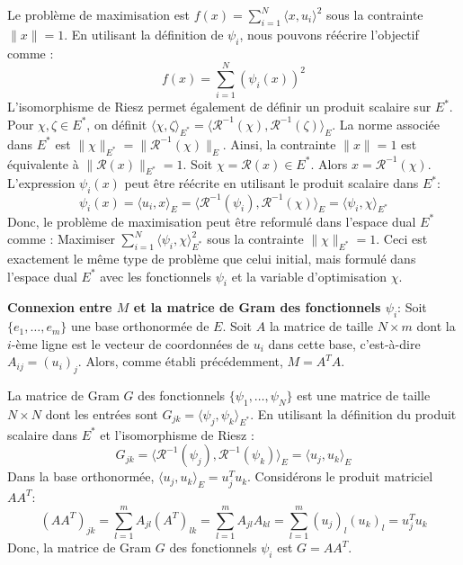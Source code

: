 \documentclass[11pt,a4paper]{report}
\begin{document}
Le problème de maximisation est
\(f(x) = \sum_{i=1}^N \langle x, u_i \rangle^2\) sous la contrainte
\(\|x\|=1\). En utilisant la définition de \(\psi_i\), nous pouvons
réécrire l'objectif comme : \[ f(x) = \sum_{i=1}^N (\psi_i(x))^2 \]
L'isomorphisme de Riesz permet également de définir un produit scalaire
sur \(E^*\). Pour \(\chi, \zeta \in E^*\), on définit
\(\langle \chi, \zeta \rangle_{E^*} = \langle \mathcal{R}^{-1}(\chi), \mathcal{R}^{-1}(\zeta) \rangle_E\).
La norme associée dans \(E^*\) est
\(\|\chi\|_{E^*} = \|\mathcal{R}^{-1}(\chi)\|_E\). Ainsi, la contrainte
\(\|x\|=1\) est équivalente à \(\|\mathcal{R}(x)\|_{E^*} = 1\). Soit
\(\chi = \mathcal{R}(x) \in E^*\). Alors \(x = \mathcal{R}^{-1}(\chi)\).
L'expression \(\psi_i(x)\) peut être réécrite en utilisant le produit
scalaire dans \(E^*\):
\[ \psi_i(x) = \langle u_i, x \rangle_E = \langle \mathcal{R}^{-1}(\psi_i), \mathcal{R}^{-1}(\chi) \rangle_E = \langle \psi_i, \chi \rangle_{E^*} \]
Donc, le problème de maximisation peut être reformulé dans l'espace dual
\(E^*\) comme : Maximiser
\(\sum_{i=1}^N \langle \psi_i, \chi \rangle_{E^*}^2\) sous la contrainte
\(\|\chi\|_{E^*} = 1\). Ceci est exactement le même type de problème que
celui initial, mais formulé dans l'espace dual \(E^*\) avec les
fonctionnels \(\psi_i\) et la variable d'optimisation \(\chi\).

\textbf{Connexion entre \(M\) et la matrice de Gram des fonctionnels
\(\psi_i\)}: Soit \(\{e_1, \dots, e_m\}\) une base orthonormée de \(E\).
Soit \(A\) la matrice de taille \(N \times m\) dont la \(i\)-ème ligne
est le vecteur de coordonnées de \(u_i\) dans cette base, c'est-à-dire
\(A_{ij} = (u_i)_j\). Alors, comme établi précédemment, \(M = A^T A\).

La matrice de Gram \(G\) des fonctionnels \(\{\psi_1, \dots, \psi_N\}\)
est une matrice de taille \(N \times N\) dont les entrées sont
\(G_{jk} = \langle \psi_j, \psi_k \rangle_{E^*}\). En utilisant la
définition du produit scalaire dans \(E^*\) et l'isomorphisme de Riesz :
\[ G_{jk} = \langle \mathcal{R}^{-1}(\psi_j), \mathcal{R}^{-1}(\psi_k) \rangle_E = \langle u_j, u_k \rangle_E \]
Dans la base orthonormée, \(\langle u_j, u_k \rangle_E = u_j^T u_k\).
Considérons le produit matriciel \(A A^T\):
\[ (A A^T)_{jk} = \sum_{l=1}^m A_{jl} (A^T)_{lk} = \sum_{l=1}^m A_{jl} A_{kl} = \sum_{l=1}^m (u_j)_l (u_k)_l = u_j^T u_k \]
Donc, la matrice de Gram \(G\) des fonctionnels \(\psi_i\) est
\(G = A A^T\).
\end{document}
